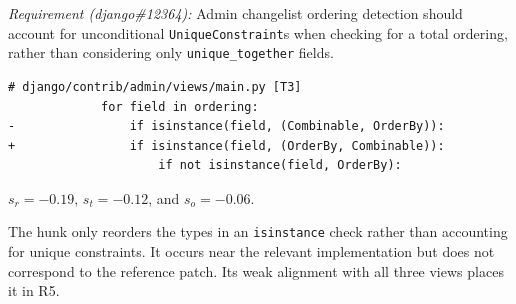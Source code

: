\smallskip
\noindent\textit{Requirement (django\#12364):}
Admin changelist ordering detection should account for unconditional \texttt{UniqueConstraint}s when checking for a total ordering, rather than considering only \texttt{unique\_together} fields.

\begin{lstlisting}
# django/contrib/admin/views/main.py [T3]
             for field in ordering:
-                if isinstance(field, (Combinable, OrderBy)):
+                if isinstance(field, (OrderBy, Combinable)):
                     if not isinstance(field, OrderBy):
\end{lstlisting}

\noindent
$s_r=-0.19$, $s_t=-0.12$, and $s_o=-0.06$.

The hunk only reorders the types in an \texttt{isinstance} check rather than accounting for unique constraints. It occurs near the relevant implementation but does not correspond to the reference patch. Its weak alignment with all three views places it in R5.
